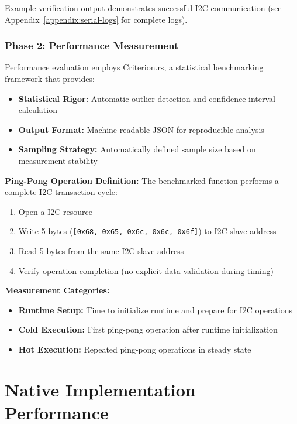 Example verification output demonstrates successful I2C communication (see Appendix~\ref{appendix:serial-logs} for complete logs).

\subsubsection{Phase 2: Performance Measurement}
\label{subsubsec:performance-measurement}

Performance evaluation employs Criterion.rs, a statistical benchmarking framework that provides:
\begin{itemize}
    \item \textbf{Statistical Rigor:} Automatic outlier detection and confidence interval calculation
    \item \textbf{Output Format:} Machine-readable JSON for reproducible analysis
    \item \textbf{Sampling Strategy:} Automatically defined sample size based on measurement stability
\end{itemize}

\textbf{Ping-Pong Operation Definition:}
The benchmarked function performs a complete I2C transaction cycle:
\begin{enumerate}
    \item Open a I2C-resource
    \item Write 5 bytes (\texttt{[0x68, 0x65, 0x6c, 0x6c, 0x6f]}) to I2C slave address
    \item Read 5 bytes from the same I2C slave address
    \item Verify operation completion (no explicit data validation during timing)
\end{enumerate}

\textbf{Measurement Categories:}
\begin{itemize}
    \item \textbf{Runtime Setup:} Time to initialize runtime and prepare for I2C operations
    \item \textbf{Cold Execution:} First ping-pong operation after runtime initialization
    \item \textbf{Hot Execution:} Repeated ping-pong operations in steady state
\end{itemize}

\section{Native Implementation Performance}
\label{sec:native-performance}

